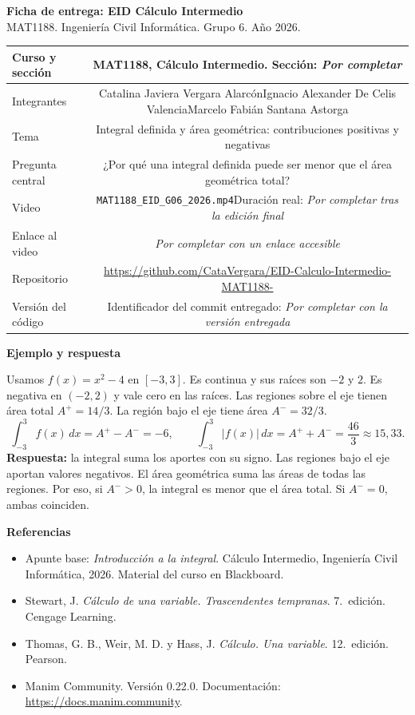 \documentclass[10pt,a4paper]{article}
\newcommand{\seccion}{\textit{Por completar}}
\newcommand{\duracion}{\textit{Por completar tras la edición final}}
\newcommand{\sha}{\textit{Por completar con la versión entregada}}
\newcommand{\enlaceVideo}{\textit{Por completar con un enlace accesible}}
\newcommand{\apartado}[1]{\vspace{4pt}\textbf{\color{azul}#1}\par}
\begin{document}
\small
{\Large\bfseries\color{azul} Ficha de entrega: EID Cálculo Intermedio}\\[3pt]
{\color{gris} MAT1188. Ingeniería Civil Informática. Grupo 6. Año 2026.}

\begin{tabularx}{\textwidth}{|E|C|}
\hline
Curso y sección & MAT1188, Cálculo Intermedio. Sección: \seccion \\\hline
Integrantes & Catalina Javiera Vergara Alarcón\newline Ignacio Alexander De Celis Valencia\newline Marcelo Fabián Santana Astorga \\\hline
Tema & Integral definida y área geométrica: contribuciones positivas y negativas \\\hline
Pregunta central & ¿Por qué una integral definida puede ser menor que el área geométrica total? \\\hline
Video & \texttt{MAT1188\_EID\_G06\_2026.mp4}\newline Duración real: \duracion \\\hline
Enlace al video & \enlaceVideo \\\hline
Repositorio & \url{https://github.com/CataVergara/EID-Calculo-Intermedio-MAT1188-} \\\hline
Versión del código & Identificador del commit entregado: \sha \\\hline
\end{tabularx}

\apartado{Ejemplo y respuesta}
Usamos $f(x)=x^2-4$ en $[-3,3]$. Es continua y sus raíces son $-2$ y $2$.
Es negativa en $(-2,2)$ y vale cero en las raíces.
Las regiones sobre el eje tienen área total $A^+=14/3$.
La región bajo el eje tiene área $A^-=32/3$.
\[
\int_{-3}^{3}f(x)\,dx=A^+-A^-=-6,\qquad
\int_{-3}^{3}|f(x)|\,dx=A^++A^-=\frac{46}{3}\approx15{,}33.
\]
\textbf{Respuesta:} la integral suma los aportes con su signo. Las regiones bajo el eje aportan valores negativos. El área geométrica suma las áreas de todas las regiones. Por eso, si $A^->0$, la integral es menor que el área total. Si $A^-=0$, ambas coinciden.

\apartado{Referencias}
\begin{itemize}[leftmargin=1.2em,itemsep=1pt,topsep=1pt]
\item Apunte base: \emph{Introducción a la integral}. Cálculo Intermedio, Ingeniería Civil Informática, 2026. Material del curso en Blackboard.
\item Stewart, J. \emph{Cálculo de una variable. Trascendentes tempranas}. 7.\textordfeminine\ edición. Cengage Learning.
\item Thomas, G. B., Weir, M. D. y Hass, J. \emph{Cálculo. Una variable}. 12.\textordfeminine\ edición. Pearson.
\item Manim Community. Versión 0.22.0. Documentación: \url{https://docs.manim.community}.
\end{itemize}
\end{document}
